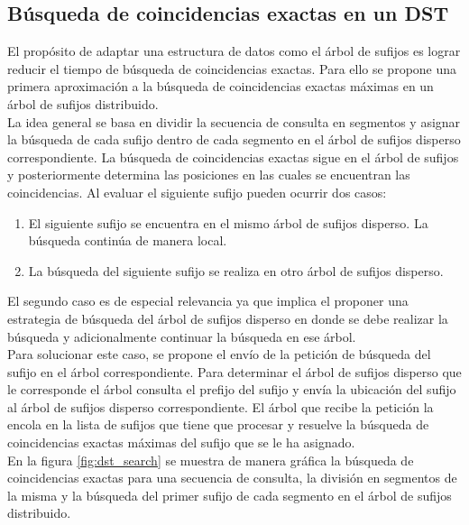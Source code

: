 \documentclass[11pt,a4paper,english]{article}
\begin{document}
\subsection{Búsqueda de coincidencias exactas en un DST}
El propósito de adaptar una estructura de datos como el árbol de sufijos es lograr reducir el tiempo de búsqueda de coincidencias
exactas. Para ello se propone una primera aproximación a la búsqueda de coincidencias exactas máximas en un árbol de sufijos 
distribuido.\\
La idea general se basa en dividir la secuencia de consulta en segmentos y asignar la búsqueda de cada sufijo dentro de cada
segmento en el árbol de sufijos disperso correspondiente. La búsqueda de coincidencias exactas sigue en el árbol de sufijos y 
posteriormente determina las posiciones en las cuales se encuentran las coincidencias. Al evaluar el siguiente sufijo pueden
ocurrir dos casos:
\begin{enumerate}
  \item El siguiente sufijo se encuentra en el mismo árbol de sufijos disperso. La búsqueda continúa de manera local.
  \item La búsqueda del siguiente sufijo se realiza en otro árbol de sufijos disperso.
\end{enumerate}
El segundo caso es de especial relevancia ya que implica el proponer una estrategia de búsqueda del árbol de sufijos disperso
en donde se debe realizar la búsqueda y adicionalmente continuar la búsqueda en ese árbol.\\
Para solucionar este caso, se propone el envío de la petición de búsqueda del sufijo en el árbol correspondiente. Para determinar
el árbol de sufijos disperso que le corresponde el árbol consulta el prefijo del sufijo y envía la ubicación del sufijo al árbol 
de sufijos disperso correspondiente. El árbol que recibe la petición la encola en la lista de sufijos que tiene que procesar y 
resuelve la búsqueda de coincidencias exactas máximas del sufijo que se le ha asignado.\\
En la figura \ref{fig:dst_search} se muestra de manera gráfica la búsqueda de coincidencias exactas para una secuencia de consulta,
la división en segmentos de la misma y la búsqueda del primer sufijo de cada segmento en el árbol de sufijos distribuido.
\end{document}
